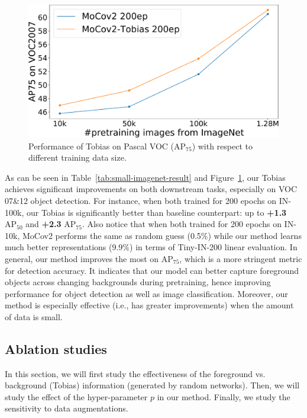 \documentclass[letterpaper]{article} %
\begin{document}
\begin{figure}
	\centering
	\includegraphics[width=0.9\linewidth]{res}
	\caption{Performance of Tobias on Pascal VOC ($\text{AP}_{75}$) with respect to different training data size.}
	\label{fig:ap-size}
\end{figure}

As can be seen in Table~\ref{tab:small-imagenet-result} and Figure~\ref{fig:ap-size}, our Tobias achieves significant improvements on both downstream tasks, especially on VOC 07\&12 object detection. For instance, when both trained for 200 epochs on IN-100k, our Tobias is significantly better than baseline counterpart: up to \textbf{+1.3} $\text{AP}_{50}$ and \textbf{+2.3} $\text{AP}_{75}$. Also notice that when both trained for 200 epochs on IN-10k, MoCov2 performs the same as random guess (0.5\%) while our method learns much better representations (9.9\%) in terms of Tiny-IN-200 linear evaluation. In general, our method improves the most on $\text{AP}_{75}$, which is a more stringent metric for detection accuracy. It indicates that our model can better capture foreground objects across changing backgrounds during pretraining, hence improving performance for object detection as well as image classification. Moreover, our method is especially effective (i.e., has greater improvements) when the amount of data is small.



\subsection{Ablation studies} \label{sec:exp3}

In this section, we will first study the effectiveness of the foreground vs. background (Tobias) information (generated by random networks). Then, we will study the effect of the hyper-parameter $p$ in our method. Finally, we study the sensitivity to data augmentations.
\end{document}

